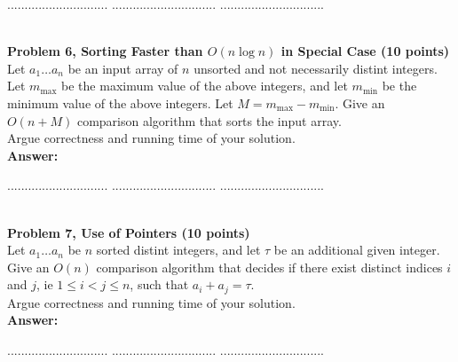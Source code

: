 \documentclass{article}
\begin{document}
\pagebreak

 $.............................$
 $..............................$
          $..............................$\

\noindent
{}\\

\medskip\noindent
{\bf Problem 6, Sorting Faster than $O(n\log n)$ in Special Case (10 points)}\\
Let $a_1 \ldots a_n$ be an input array of $n$ unsorted and not necessarily distint integers. 
Let $m_{\max}$ be the maximum value of the above integers, and 
let $m_{\min}$ be the minimum value of the above integers.
Let $M=m_{\max}-m_{\min}$.
Give an $O(n+M)$ comparison algorithm that sorts the input array.\\
Argue correctness and running time of your solution.\\

\noindent
{\bf Answer:}

\pagebreak
{} $.............................$
 $..............................$
          $..............................$

\noindent
{}\\


\medskip\noindent
{\bf Problem 7, Use of  Pointers (10 points)}\\
Let $a_1 \ldots a_n$ be $n$ sorted distint integers, 
and let $\tau$ be an additional given integer.
Give an $O(n)$ comparison algorithm that decides if there exist distinct indices $i$ and $j$,
ie $1\leq i < j \leq n$, such that $a_i+a_j=\tau$.\\
Argue correctness and running time of your solution.\\

\noindent
{\bf Answer:}


\pagebreak
{} $.............................$
 $..............................$
          $..............................$

\\
\end{document}
